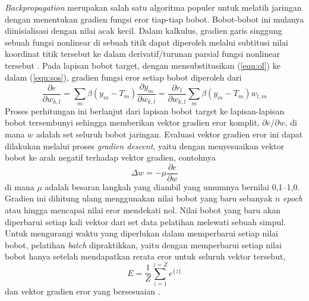 \textit{Backpropagation}  merupakan salah satu algoritma populer untuk melatih jaringan dengan menentukan gradien fungsi eror tiap-tiap bobot. Bobot-bobot ini mulanya diinisialisasi dengan nilai acak kecil. Dalam kalkulus, gradien garis singgung sebuah fungsi nonlinear di sebuah titik dapat diperoleh melalui subtitusi nilai koordinat titik tersebut ke dalam derivatif/turunan parsial fungsi nonlinear tersebut . Pada lapisan bobot target, dengan mensubstitusikan (\ref{equ:ol}) ke dalam (\ref{equ:sos}), gradien fungsi eror setiap bobot diperoleh dari
\begin{equation}
    \frac{\partial e}{\partial w_{k,l}} = \sum_m{\beta(y_m - T_m) \frac{\partial y_m}{\partial w_{k,l}}} = \frac{\partial r_l}{\partial w_{k,l}} \sum_m{\beta(y_m - T_m) w_{l,m}}
\end{equation}
Proses perhitungan ini berlanjut dari lapisan bobot target ke lapisan-lapisan bobot tersembunyi sehingga memberikan vektor gradien eror komplit, ${\partial e}/{\partial w}$, di mana $w$ adalah set seluruh bobot jaringan. Evaluasi vektor gradien eror ini dapat dilakukan melalui proses \textit{gradien descent}, yaitu dengan menyesuaikan vektor bobot ke arah negatif terhadap vektor gradien, contohnya
\begin{equation}
    \Delta w = -\mu\frac{\partial e}{\partial w}
\end{equation}
di mana $\mu$ adalah besaran langkah yang diambil yang umumnya bernilai 0,1--1,0. Gradien ini dihitung ulang menggunakan nilai bobot yang baru sebanyak $n$ \textit{epoch} atau hingga mencapai nilai eror mendekati nol. Nilai bobot yang baru akan diperbarui setiap kali vektor dari set data pelatihan melewati sebuah simpul. Untuk mengurangi waktu yang diperlukan dalam memperbarui setiap nilai bobot, pelatihan \textit{batch} dipraktikkan, yaitu dengan memperbarui setiap nilai bobot hanya setelah mendapatkan rerata eror untuk seluruh vektor tersebut,
\begin{equation}
    E = \frac{1}{Z} \sum_{z=1}^{z=Z}{e^{\{z\}}}
\end{equation}
dan vektor gradien eror yang bersesuaian .


